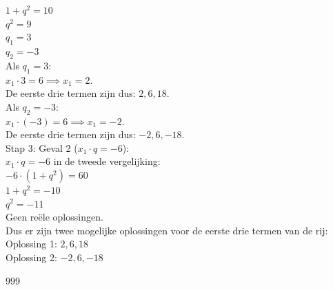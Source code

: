 \documentclass[a4paper]{article}
\begin{document}
$1 + q^2 = 10$\\

$q^2 = 9$\\

$q_1 = 3$\\

$q_2 = -3$\\


Als $q_1 = 3$: \\

$x_1 \cdot 3 = 6 \implies x_1 = 2$. \\

De eerste drie termen zijn dus: $2, 6, 18$.\\
    
Als $q_2 = -3$: \\

$x_1 \cdot (-3) = 6 \implies x_1 = -2$. \\

De eerste drie termen zijn dus: $-2, 6, -18$.\\

Stap 3: Geval 2 ($x_1 \cdot q = -6$):\\

$x_1 \cdot q = -6$ in de tweede vergelijking:\\

$-6 \cdot (1 + q^2) = 60$ \\

$1 + q^2 = -10$\\

$q^2 = -11$\\

Geen reële oplossingen.\\

Dus er zijn twee mogelijke oplossingen voor de eerste drie termen van de rij:\\

Oplossing 1: $2, 6, 18$\\

Oplossing 2: $ -2, 6, -18$\\

\begin{thebibliography}{999}
\end{thebibliography}
\end{document}
